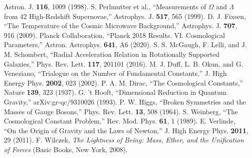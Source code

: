 \documentclass[12pt,a4paper]{article} %
\begin{document}
\begin{thebibliography}{99}
		Astron. J. \textbf{116}, 1009 (1998).
		S. Perlmutter et al.,
		``Measurements of $\Omega$ and $\Lambda$ from 42 High-Redshift Supernovae,''
		Astrophys. J. \textbf{517}, 565 (1999).
		D. J. Fixsen,
		``The Temperature of the Cosmic Microwave Background,''
		Astrophys. J. \textbf{707}, 916 (2009).
		Planck Collaboration,
		``Planck 2018 Results. VI. Cosmological Parameters,''
		Astron. Astrophys. \textbf{641}, A6 (2020).
		S. S. McGaugh, F. Lelli, and J. M. Schombert,
		``Radial Acceleration Relation in Rotationally Supported Galaxies,''
		Phys. Rev. Lett. \textbf{117}, 201101 (2016).
		M. J. Duff, L. B. Okun, and G. Veneziano,
		``Trialogue on the Number of Fundamental Constants,''
		J. High Energy Phys. \textbf{2002}, 023 (2002).
		P. A. M. Dirac,
		``The Cosmological Constants,''
		Nature \textbf{139}, 323 (1937).
		G. 't Hooft,
		``Dimensional Reduction in Quantum Gravity,''
		arXiv:gr-qc/9310026 (1993).
		P. W. Higgs,
		``Broken Symmetries and the Masses of Gauge Bosons,''
		Phys. Rev. Lett. \textbf{13}, 508 (1964).
		S. Weinberg,
		``The Cosmological Constant Problem,''
		Rev. Mod. Phys. \textbf{61}, 1 (1989).
		E. Verlinde,
		``On the Origin of Gravity and the Laws of Newton,''
		J. High Energy Phys. \textbf{2011}, 29 (2011).
		F. Wilczek,
		\textit{The Lightness of Being: Mass, Ether, and the Unification of Forces}
		(Basic Books, New York, 2008).
	\end{thebibliography}
	
\end{document}
